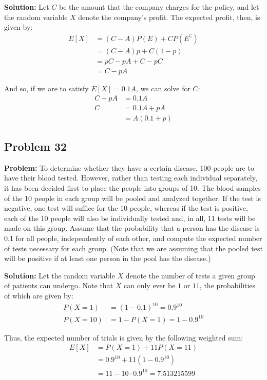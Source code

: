 \documentclass{article}
\begin{document}
\noindent\textbf{Solution:} Let $C$ be the amount that the company charges for the policy, and let the random variable $X$ denote the company's profit. The expected profit, then, is given by:
\begin{align*}
    E[X]&=(C-A)P(E)+CP(E^\complement)\\
    &=(C-A)p+C(1-p)\\
    &=pC-pA+C-pC\\
    &=C-pA
\end{align*}

And so, if we are to satisfy $E[X]=0.1A$, we can solve for $C$:
\begin{align*}
    C-pA&=0.1A\\
    C&=0.1A+pA\\
    &=A(0.1+p)
\end{align*}

\subsection*{Problem 32}
\noindent\textbf{Problem:} To determine whether they have a certain disease, 100 people are to have their blood tested. However, rather than testing each individual separately, it has been decided first to place the people into groups of 10. The blood samples of the 10 people in each group will be pooled and analyzed together. If the test is negative, one test will suffice for the 10 people, whereas if the test is positive, each of the 10 people will also be individually tested and, in all, 11 tests will be made on this group. Assume that the probability that a person has the disease is 0.1 for all people, independently of each other, and compute the expected number of tests necessary for each group. (Note that we are assuming that the pooled test will be positive if at least one person in the pool has the disease.)
\bigskip

\noindent\textbf{Solution:} Let the random variable $X$ denote the number of tests a given group of patients can undergo. Note that $X$ can only ever be $1$ or $11$, the probabilities of which are given by:
\begin{align*}
    P(X=1)&=(1-0.1)^{10}=0.9^{10}\\
    P(X=10)&=1-P(X=1)=1-0.9^{10}
\end{align*}

Thus, the expected number of trials is given by the following weighted sum:
\begin{align*}
    E[X]&=P(X=1)+11P(X=11)\\
    &=0.9^{10}+11(1-0.9^{10})\\
    &=11-10\cdot0.9^{10}=7.513215599
\end{align*}
\pagebreak
\end{document}
